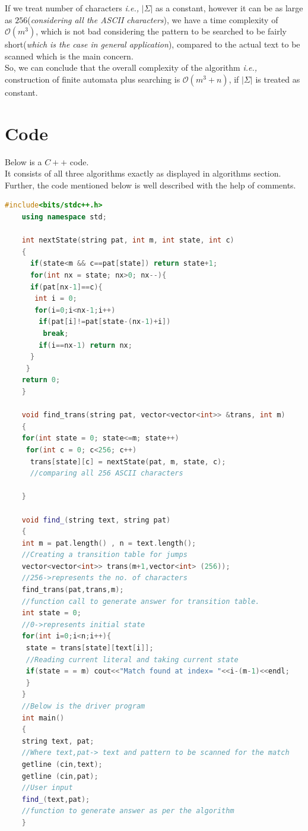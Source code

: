 \documentclass[12pt,a4paper]{article}%
\begin{document}
\begin{flushleft}
	If we treat number of characters \textit{i.e.,} $|\Sigma|$ as a constant, however it can be as large as $256$(\textit{considering all the ASCII characters}), we have a time complexity of $\mathcal{O}(m^{3})$, which is not bad considering the pattern to be searched to be fairly short(\textit{which is the case in general application}), compared to the actual text to be scanned which is the main concern.\\\bigskip
	So, we can conclude that the overall complexity of the algorithm \textit{i.e.,} construction of finite automata plus searching is $\mathcal{O}(m^{3}+n)$, if $|\Sigma|$ is treated as constant. 
	\end{flushleft}
	\pagebreak
	\section{Code}
	\begin{flushleft}
		Below is a $C++$ code.\\\bigskip
		It consists of all three algorithms exactly as displayed in algorithms section. Further, the code mentioned below is well described with the help of comments.\\\bigskip
	\end{flushleft}
	\begin{lstlisting}[language=C++, caption={C++ code for searching}]
	#include<bits/stdc++.h>
	using namespace std;
	
	int nextState(string pat, int m, int state, int c)
	{
   	  if(state<m && c==pat[state]) return state+1;
 	  for(int nx = state; nx>0; nx--){
	  if(pat[nx-1]==c){
	   int i = 0;
	   for(i=0;i<nx-1;i++)
	    if(pat[i]!=pat[state-(nx-1)+i])
	     break;
	    if(i==nx-1) return nx;
	  }
	 }
	return 0;
	}
	
	void find_trans(string pat, vector<vector<int>> &trans, int m)
	{
	for(int state = 0; state<=m; state++)
	 for(int c = 0; c<256; c++)
	  trans[state][c] = nextState(pat, m, state, c);
	  //comparing all 256 ASCII characters
	  
	}
	
	void find_(string text, string pat)
	{
	int m = pat.length() , n = text.length();
	//Creating a transition table for jumps
	vector<vector<int>> trans(m+1,vector<int> (256));
	//256->represents the no. of characters
	find_trans(pat,trans,m);
	//function call to generate answer for transition table.
	int state = 0;
	//0->represents initial state
	for(int i=0;i<n;i++){
	 state = trans[state][text[i]];
	 //Reading current literal and taking current state
	 if(state = = m) cout<<"Match found at index= "<<i-(m-1)<<endl;
	 }
	}
	//Below is the driver program
	int main()
	{
	string text, pat;
	//Where text,pat-> text and pattern to be scanned for the match
	getline (cin,text);
	getline (cin,pat);
	//User input
	find_(text,pat);
	//function to generate answer as per the algorithm
	}
	\end{lstlisting}
\end{document}
